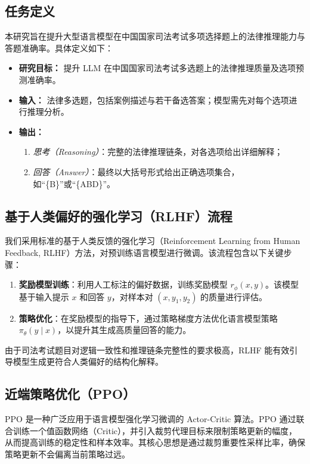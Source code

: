 \documentclass{pkuthesis}
\begin{document}
\subsection{任务定义}
本研究旨在提升大型语言模型在中国国家司法考试多项选择题上的法律推理能力与答题准确率。具体定义如下：

\begin{itemize}
  \item \textbf{研究目标：}
    提升 LLM 在中国国家司法考试多选题上的法律推理质量及选项预测准确率。
  \item \textbf{输入：}
    法律多选题，包括案例描述与若干备选答案；模型需先对每个选项进行推理分析。
  \item \textbf{输出：}
    \begin{enumerate}
      \item \emph{思考（Reasoning）}：完整的法律推理链条，对各选项给出详细解释；
      \item \emph{回答（Answer）}：最终以大括号形式给出正确选项集合，如“\{B\}”或“\{ABD\}”。
    \end{enumerate}
\end{itemize}



\subsection{基于人类偏好的强化学习（RLHF）流程}
我们采用标准的基于人类反馈的强化学习（Reinforcement Learning from Human Feedback, RLHF）方法，对预训练语言模型进行微调。该流程包含以下关键步骤：
\begin{enumerate}
    \item \textbf{奖励模型训练}：利用人工标注的偏好数据，训练奖励模型 \( r_{\phi}(x, y) \)。该模型基于输入提示 \( x \) 和回答 \( y \)，对样本对 \((x, y_1, y_2)\) 的质量进行评估。
    \item \textbf{策略优化}：在奖励模型的指导下，通过策略梯度方法优化语言模型策略 \( \pi_{\theta}(y \mid x) \)，以提升其生成高质量回答的能力。
\end{enumerate}
由于司法考试题目对逻辑一致性和推理链条完整性的要求极高，RLHF 能有效引导模型生成更符合人类偏好的结构化解释。

\subsection{近端策略优化（PPO）}
PPO \cite{schulman2017proximal}是一种广泛应用于语言模型强化学习微调的 Actor-Critic 算法。PPO 通过联合训练一个值函数网络（Critic），并引入裁剪代理目标来限制策略更新的幅度，从而提高训练的稳定性和样本效率。其核心思想是通过裁剪重要性采样比率，确保策略更新不会偏离当前策略过远。
\end{document}
